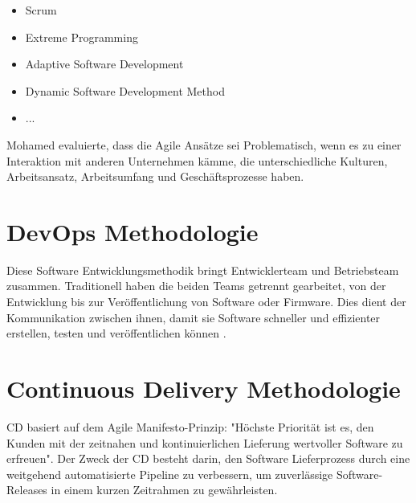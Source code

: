 \begin{itemize}
	\item Scrum
	\item Extreme Programming
	\item Adaptive Software Development
	\item Dynamic Software Development Method
	\item ...
\end{itemize}

Mohamed \cite{FernandoBritoE:AbreuDaSilva} evaluierte, dass die Agile Ansätze sei Problematisch, wenn es zu einer Interaktion mit anderen Unternehmen
kämme, die unterschiedliche Kulturen, Arbeitsansatz, Arbeitsumfang und Geschäftsprozesse
haben.

\section{DevOps Methodologie}

Diese Software Entwicklungsmethodik bringt Entwicklerteam und Betriebsteam zusammen.
Traditionell haben die beiden Teams getrennt gearbeitet, von der Entwicklung
bis zur Veröffentlichung von Software oder Firmware. Dies dient der Kommunikation
zwischen ihnen, damit sie Software schneller und effizienter erstellen, testen
und veröffentlichen können \cite{Novatec}.

\section{Continuous Delivery Methodologie}

\ac{CD} basiert auf dem Agile Manifesto-Prinzip: "Höchste Priorität ist es, den Kunden mit der zeitnahen und kontinuierlichen Lieferung wertvoller Software zu erfreuen". Der Zweck der \acs{CD} besteht darin, den Software Lieferprozess durch eine weitgehend automatisierte Pipeline zu verbessern, um zuverlässige Software-Releases in einem kurzen Zeitrahmen zu gewährleisten.
